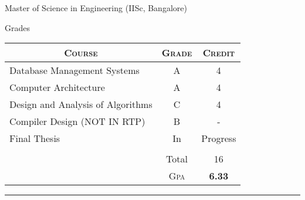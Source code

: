 \documentclass[a4paper,10pt]{article} %
\begin{document}
\newpage


\par{\centering\Large \hypertarget{iisc}{Master of Science in  Engineering (IISc, Bangalore)}\par}\large{\centering Grades\par}\normalsize

\begin{center}
\begin{tabular}{lcc}
\multicolumn{1}{c}{\textsc{Course}} & \textsc{Grade}&\textsc{Credit}\\ \hline
Database Management Systems & A & 4\\
Computer Architecture & A & 4\\
Design and Analysis of Algorithms & C & 4\\
Compiler Design (NOT IN RTP) & B & -\\
Final Thesis & In & Progress\\
&&\\
& Total & 16\\\cline{2-3}
&\textsc{Gpa}&\textbf{6.33}
\end{tabular}
\end{center}
\bigskip
\hrule
\bigskip


\bigskip
\end{document}
